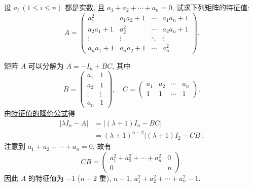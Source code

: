 \documentclass[../../main.tex]{subfiles}
\begin{document}
\begin{example}
设 $a_i \ (1 \leq i \leq n)$ 都是实数, 且 $a_1 + a_2 + \cdots + a_n = 0$, 试求下列矩阵的特征值:
\[
A = 
\begin{pmatrix}
a_1^2 & a_1 a_2 + 1 & \cdots & a_1 a_n + 1 \\
a_2 a_1 + 1 & a_2^2 & \cdots & a_2 a_n + 1 \\
\vdots & \vdots & \ddots & \vdots \\
a_n a_1 + 1 & a_n a_2 + 1 & \cdots & a_n^2
\end{pmatrix}.
\]
\end{example}
\begin{solution}
矩阵 $A$ 可以分解为 $A = -I_n + BC$, 其中
\[
B = 
\begin{pmatrix}
a_1 & 1 \\
a_2 & 1 \\
\vdots & \vdots \\
a_n & 1
\end{pmatrix}, \quad
C = 
\begin{pmatrix}
a_1 & a_2 & \cdots & a_n \\
1 & 1 & \cdots & 1
\end{pmatrix}.
\]
由\hyperref[theorem:特征值的降价公式]{特征值的降价公式}得
\begin{align*}
| \lambda I_n - A | 
&= | (\lambda + 1) I_n - BC | \\
&= (\lambda + 1)^{n-2} | (\lambda + 1) I_2 - CB |.
\end{align*}
注意到 $a_1 + a_2 + \cdots + a_n = 0$, 故有
\[
CB = 
\begin{pmatrix}
a_1^2 + a_2^2 + \cdots + a_n^2 & 0 \\
0 & n
\end{pmatrix}.
\]
因此 $A$ 的特征值为 $-1$ ($n-2$ 重), $n-1$, $a_1^2 + a_2^2 + \cdots + a_n^2 - 1$.
\end{solution}
\end{document}
